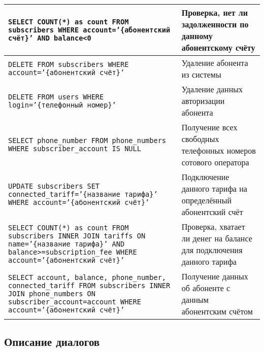 \begin{xltabular}[h]{\textwidth}{|p{0.7 \textwidth}|X|}
    \texttt{SELECT COUNT(*) as count FROM subscribers WHERE account='\{абонентский счёт\}' AND balance<0}                                                                                                                 & Проверка, нет ли задолженности по данному абонентскому счёту                    \\ \hline
    \texttt{DELETE FROM subscribers WHERE account='\{абонентский счёт\}'}                                                                                                                                                 & Удаление абонента из системы                                                    \\ \hline
    \texttt{DELETE FROM users WHERE login='\{телефонный номер\}'}                                                                                                                                                         & Удаление данных авторизации абонента                                            \\ \hline
    \texttt{SELECT phone\_number FROM phone\_numbers WHERE subscriber\_account IS NULL}                                                                                                                                   & Получение всех свободных телефонных номеров сотового оператора                  \\ \hline
    \texttt{UPDATE subscribers SET connected\_tariff='\{название тарифа\}'  WHERE account='\{абонентский счёт\}'}                                                                                                         & Подключение данного тарифа на определённый абонентский счёт                     \\ \hline
    \texttt{SELECT COUNT(*) as count FROM subscribers INNER JOIN tariffs ON name='\{название тарифа\}' AND balance>=subscription\_fee WHERE account='\{абонентский счёт\}'}                                               & Проверка, хватает ли денег на балансе для подключения данного тарифа            \\ \hline
    \texttt{SELECT account, balance, phone\_number, connected\_tariff FROM subscribers INNER JOIN phone\_numbers ON subscriber\_account=account WHERE account='\{абонентский счёт\}'}                                     & Получение данных об абоненте с данным абонентским счётом                        \\ \hline
\end{xltabular}


\subsection{Описание диалогов}


